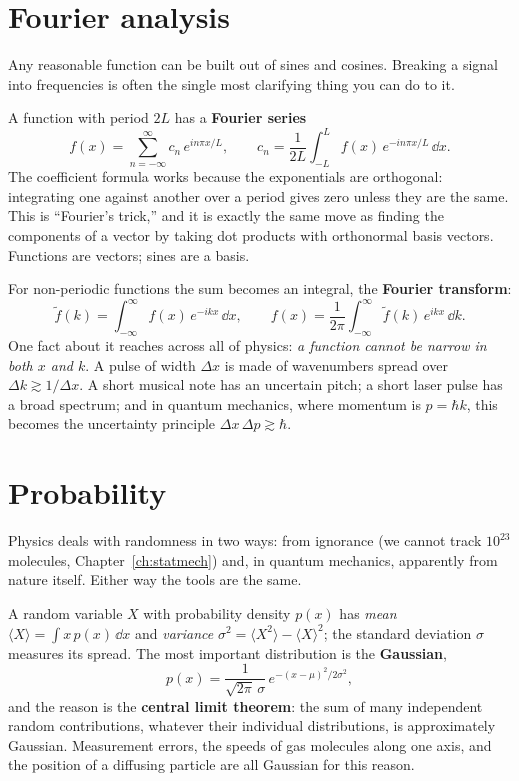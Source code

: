 \section{Fourier analysis}

\begin{keyidea}
Any reasonable function can be built out of sines and cosines. Breaking a signal into frequencies is often the single most clarifying thing you can do to it.
\end{keyidea}

A function with period $2L$ has a \textbf{Fourier series}
\[
  f(x) = \sum_{n=-\infty}^{\infty} c_n\, e^{i n\pi x/L},
  \qquad
  c_n = \frac{1}{2L}\int_{-L}^{L} f(x)\,e^{-in\pi x/L}\,\dd x .
\]
The coefficient formula works because the exponentials are orthogonal: integrating one against another over a period gives zero unless they are the same. This is ``Fourier's trick,'' and it is exactly the same move as finding the components of a vector by taking dot products with orthonormal basis vectors. Functions are vectors; sines are a basis.

For non-periodic functions the sum becomes an integral, the \textbf{Fourier transform}:
\[
  \tilde f(k) = \int_{-\infty}^{\infty} f(x)\,e^{-ikx}\,\dd x,
  \qquad
  f(x) = \frac{1}{2\pi}\int_{-\infty}^{\infty} \tilde f(k)\,e^{ikx}\,\dd k .
\]
One fact about it reaches across all of physics: \emph{a function cannot be narrow in both $x$ and $k$}. A pulse of width $\Delta x$ is made of wavenumbers spread over $\Delta k \gtrsim 1/\Delta x$. A short musical note has an uncertain pitch; a short laser pulse has a broad spectrum; and in quantum mechanics, where momentum is $p = \hbar k$, this becomes the uncertainty principle $\Delta x\,\Delta p\gtrsim\hbar$.

\section{Probability}

Physics deals with randomness in two ways: from ignorance (we cannot track $10^{23}$ molecules, Chapter~\ref{ch:statmech}) and, in quantum mechanics, apparently from nature itself. Either way the tools are the same.

A random variable $X$ with probability density $p(x)$ has \emph{mean} $\langle X\rangle = \int x\,p(x)\,\dd x$ and \emph{variance} $\sigma^2 = \langle X^2\rangle - \langle X\rangle^2$; the standard deviation $\sigma$ measures its spread. The most important distribution is the \textbf{Gaussian},
\[
  p(x) = \frac{1}{\sqrt{2\pi}\,\sigma}\, e^{-(x-\mu)^{2}/2\sigma^{2}},
\]
and the reason is the \textbf{central limit theorem}: the sum of many independent random contributions, whatever their individual distributions, is approximately Gaussian. Measurement errors, the speeds of gas molecules along one axis, and the position of a diffusing particle are all Gaussian for this reason.

